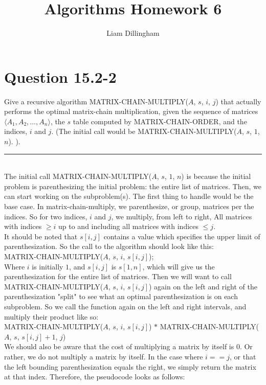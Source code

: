 \documentclass[20pt]{article} %
\title{Algorithms Homework 6}
\author{Liam Dillingham}
\begin{document}
\maketitle

\section{Question 15.2-2} 
Give a recursive algorithm MATRIX-CHAIN-MULTIPLY($A$, $s$, $i$, $j$) that actually performs the optimal matrix-chain multiplication, given the sequence of matrices $\langle A_1, A_2, ..., A_n \rangle$, the $s$ table computed  by MATRIX-CHAIN-ORDER, and the indices, $i$ and $j$. (The initial call would be MATRIX-CHAIN-MULTIPLY($A$, $s$, $1$, $n$). ). \\
\noindent\rule{2cm}{0.4pt} \\

The initial call MATRIX-CHAIN-MULTIPLY($A$, $s$, $1$, $n$) is because the initial problem is parenthesizing the initial problem: the entire list of matrices.  Then, we can start working on the subproblem(s).  The first thing to handle would be the base case.  In matrix-chain-multiply, we parenthesize, or group, matrices per the indices.  So for two indices, $i$ and $j$, we multiply, from left to right, All matrices with indices $\geq i$ up to and including all matrices with indices $\leq j$.\\ 

It should be noted that $s[i, j]$ contains a value which specifies the upper limit of parenthesization.  So the call to the algorithm should look like this: \\

MATRIX-CHAIN-MULTIPLY($A$, $s$, $i$, $s[i, j]$); \\

Where $i$ is initially $1$, and $s[i,j]$ is $s[1,n]$, which will give us the parenthesization for the entire list of matrices.  Then we will want to call MATRIX-CHAIN-MULTIPLY($A$, $s$, $i$, $s[i, j]$) again on the left and right of the parenthesization "split" to see what an optimal parenthesization is on each subproblem.  So we call the function again on the left and right intervals, and multiply their product like so: \\ 

MATRIX-CHAIN-MULTIPLY($A$, $s$, $i$, $s[i, j]$) $*$ MATRIX-CHAIN-MULTIPLY($A$, $s$, $s[i, j]+1$, $j$) \\

We should also be aware that the cost of multiplying a matrix by itself is $0$. Or rather, we do not multiply a matrix by itself. In the case where $i == j$, or that the left bounding parenthesization equals the right, we simply return the matrix at that index. Therefore, the pseudocode looks as follows:
\end{document}
